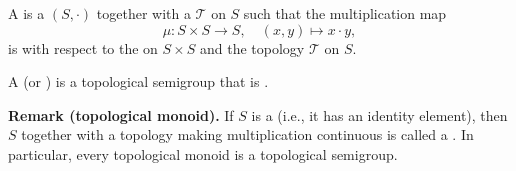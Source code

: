\begin{definition} \label{definition:topological_semigroup}
    A  is a  $(S,\cdot)$ together with a  $\mathcal{T}$ on $S$ such that the multiplication map
    $$\mu : S \times S \to S, \quad (x,y) \mapsto x \cdot y,$$
    is  with respect to the  on $S \times S$ and the topology $\mathcal{T}$ on $S$.

    A  (or ) is a topological semigroup that is .

    \medskip
    \noindent\textbf{Remark (topological monoid).} If $S$ is a  (i.e., it has an identity element), then $S$ together with a topology making multiplication continuous is called a . In particular, every topological monoid is a topological semigroup.
\end{definition}
